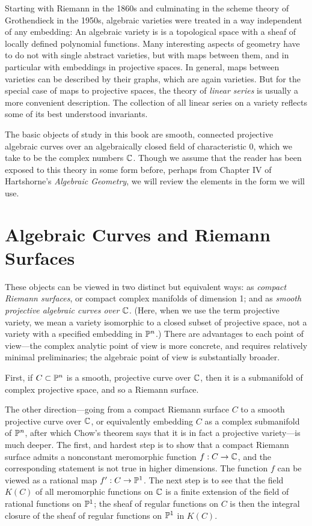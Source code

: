 Starting with Riemann in the 1860s and culminating in the scheme theory of Grothendieck in the 1950s, algebraic varieties were treated in a way independent of any embedding: An algebraic variety is is a topological space with a sheaf of locally
defined polynomial functions. Many interesting aspects of geometry have to do not with single abstract varieties, but with maps between them, and in particular with embeddings in projective spaces. In general, maps between varieties can be described by their graphs, which are again varieties.  But for the special case of maps to projective spaces, the theory of \emph{linear series} is usually a more convenient description. The collection of all linear series on a variety reflects some of its best understood invariants. 

The basic objects of study in this book are smooth, connected projective algebraic curves over an algebraically closed field of characteristic 0, which we take to be the complex numbers $\CC$. Though we assume that the reader has been exposed to this theory in some form before, perhaps from Chapter IV of Hartshorne's {\it Algebraic Geometry}, we will review the elements  in the form we will use. 

\section{Algebraic Curves and Riemann Surfaces}

These objects can be viewed in two distinct but equivalent ways: as \emph{compact Riemann surfaces}, or compact complex manifolds of dimension 1; and as \emph{smooth projective algebraic curves over $\CC$}. (Here, when we use the term projective variety, we mean a variety isomorphic to a closed subset of projective space, not a variety with a specified embedding in $\PP^n$.) There are advantages to each point of view---the complex analytic point of view is more concrete, and requires relatively minimal preliminaries; the algebraic point of view is substantially broader. 

First, if $C \subset \PP^n$ is a smooth, projective curve over $\CC$, then it is a submanifold of complex projective space, and so a Riemann surface. 

The other direction---going from a compact Riemann surface $C$ to a smooth projective curve over $\CC$, or equivalently embedding $C$ as a complex submanifold of $\PP^n$, after which Chow's theorem says that it is in fact a projective variety---is much deeper. The first, and hardest step is to show that a compact Riemann surface admits a nonconstant meromorphic function $f:C \to \CC$, and the corresponding statement is not true in higher dimensions. The function $f$ can be viewed as
a rational map $f': C\to \PP^{1}$. The next step is to see that the field $K(C)$ of all meromorphic functions
on $\CC$ is a finite extension of the field of rational functions on $\PP^{1}$; the sheaf of regular functions on $C$ is then the integral closure of the sheaf of regular functions on $\PP^{1}$ in $K(C)$.

